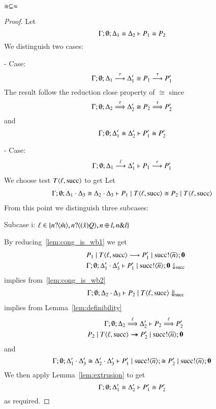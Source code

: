 \begin{lemma}\rm
	\label{lem:cong_is_wb}
	$\cong \subseteq \approx$
\end{lemma}

\begin{proof}
	\noi Let
	\[
		\Gamma; \emptyset; \Delta_1 \cong \Delta_2 \vdash P_1 \cong P_2
	\]
	\noi We distinguish two cases:

	\noi - Case:
	\[
		\Gamma; \emptyset; \Delta_1 \stackrel{\tau}{\longrightarrow} \Delta_1' \cong P_1 \stackrel{\tau}{\longrightarrow} P_1' 
	\]
	\noi The result follow the reduction close property of $\cong$ since
	\[
		\Gamma; \emptyset; \Delta_2 \stackrel{\tau}{\Longrightarrow} \Delta_2' \cong P_2 \stackrel{\tau}{\Longrightarrow} P_2' 
	\]
	\noi and
	\[
		\Gamma; \emptyset; \Delta_1' \cong \Delta_2' \vdash P_1' \cong P_2'
	\]

	\noi - Case:
	\begin{eqnarray}
		\Gamma; \emptyset; \Delta_1 \stackrel{\ell}{\longrightarrow} \Delta_1' \vdash P_1 \stackrel{\tau}{\longrightarrow} P_1'
		\label{lem:cong_is_wb1}
	\end{eqnarray}
	We choose test $T\langle \ell, \textrm{succ} \rangle$ to get
	\noi Let
	\begin{eqnarray}
		\Gamma; \emptyset; \Delta_1 \cdot \Delta_3 \cong \Delta_2 \cdot \Delta_3 \vdash P_1 \;|\; T\langle \ell, \textrm{succ} \rangle \cong P_2 \;|\; T\langle \ell, \textrm{succ} \rangle
		\label{lem:cong_is_wb2}
	\end{eqnarray}
%
	\noi From this point we distinguish three subcases:

	\noi Subcase i: $\ell \in \{n ? \langle \tilde{m} \rangle, n ? \langle (\tilde{x}) Q \rangle, n \oplus l, n \& l\}$

	\noi By reducing~\ref{lem:cong_is_wb1} we get
	\begin{eqnarray*}
		&&P_1 \;|\; T\langle \ell, \textrm{succ} \rangle \longrightarrow P_1' \;|\; \textrm{succ} ! \langle \overline{n} \rangle ; \mathbf{0} \\
		&&\Gamma; \emptyset; \Delta_1' \cdot \Delta_3' \vdash P_1' \;|\; \textrm{succ} ! \langle \overline{n} \rangle ; \mathbf{0} \downarrow_{\textrm{succ}}
	\end{eqnarray*}
	\noi implies from~\ref{lem:cong_is_wb2}
	\begin{eqnarray*}
		&&\Gamma; \emptyset; \Delta_2 \cdot \Delta_3 \vdash P_2 \;|\; T\langle \ell, \textrm{succ} \rangle \Downarrow_{\textrm{succ}}
	\end{eqnarray*}
	\noi implies from Lemma~\ref{lem:definibility}
	\begin{eqnarray*}
		&&\Gamma; \emptyset; \Delta_2 \stackrel{\ell}{\Longrightarrow} \Delta_2' \vdash P_2 \stackrel{\ell}{\Longrightarrow} P_2'\\
		&&P_2 \;|\; T \langle \ell, \textrm{succ} \rangle \rightarrow\!\!\!\!\!\rightarrow P_2' \;|\; \textrm{succ} ! \langle \overline{n} \rangle ; \mathbf{0}
	\end{eqnarray*}
	\noi and
	\[
		\Gamma; \emptyset; \Delta_1' \cdot \Delta_3' \cong \Delta_2' \cdot \Delta_3' \vdash P_1' \;|\; \textrm{succ} ! \langle \overline{n} \rangle ; \cong P_2' \;|\; \textrm{succ} ! \langle \overline{n} \rangle ; \mathbf{0}
	\]
	We then apply Lemma~\ref{lem:extrusion} to get
	\[
		\Gamma; \emptyset; \Delta_1' \cong \Delta_2' \vdash P_1' \cong P_2'
	\]
	\noi as required.


\end{proof}
